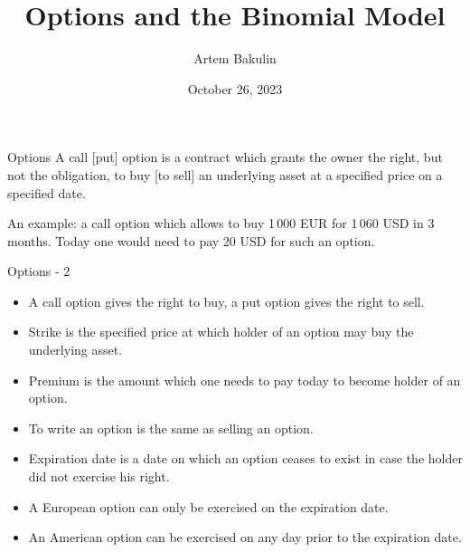 \documentclass{beamer}
\title{Options and the Binomial Model}
\author{Artem Bakulin}
\date{October 26, 2023}
\begin{document}
\begin{frame}
\titlepage
\end{frame}



\begin{frame}{Options}
\justifying
A \alert{call  [put] option} is a contract which grants the owner the right, but not the obligation, to buy [to sell] an underlying asset at a specified price on a specified date.

\justify
An example: a call option which allows to buy 1\,000 EUR for 1\,060 USD in 3 months. Today one would need to pay 20 USD for such an option.
\end{frame}



\begin{frame}{Options - 2}
\begin{itemize}
\justifying
\item A \alert{call} option gives the right to buy, a \alert{put} option gives the right to sell.
\item \alert{Strike} is the specified price at which holder of an option may buy the underlying asset.
\item \alert{Premium} is the amount which one needs to pay today to become holder of an option.
\item To \alert{write} an option is the same as selling an option.
\item \alert{Expiration date} is a date on which an option ceases to exist in case the holder did not exercise his right.
\item A \alert{European} option can only be exercised on the expiration date.
\item An \alert{American} option can be exercised on any day prior to the expiration date.
\end{itemize}
\end{frame}



\newcommand{\circlewithtext}[3]{
    \node[circle, fill, inner sep = 1.5pt] at (#1, #2) {};
    \node[anchor = north] at (#1, #2) {#3};
}
\end{document}
